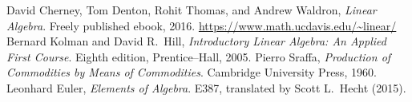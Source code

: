 \begin{thebibliography}{99}
David Cherney, Tom Denton, Rohit Thomas, and Andrew Waldron,\newline
\textit{Linear Algebra}.\newline
Freely published ebook, 2016.\newline
\url{https://www.math.ucdavis.edu/~linear/}
 Bernard Kolman and David R.\ Hill,\newline
\textit{Introductory Linear Algebra: An Applied First Course}.\newline
Eighth edition, Prentice--Hall, 2005.
 Pierro Sraffa,\newline
\textit{Production of Commodities by Means of Commodities}.\newline
Cambridge University Press, 1960.
 Leonhard Euler,\newline
\textit{Elements of Algebra}.\newline
E387, translated by Scott L.\ Hecht (2015).
\end{thebibliography}